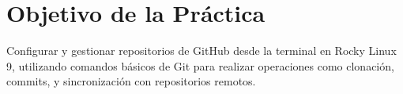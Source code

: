 \section{Objetivo de la Práctica}
Configurar y gestionar repositorios de GitHub desde la terminal en Rocky Linux 9, utilizando comandos básicos de Git para realizar operaciones como clonación, commits, y sincronización con repositorios remotos.
